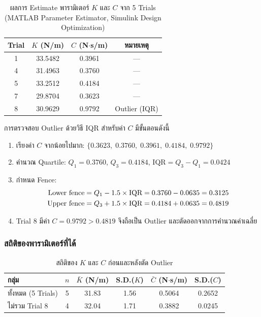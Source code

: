 \begin{table}[htbp]
    \centering
    \caption{ผลการ Estimate พารามิเตอร์ $K$ และ $C$ จาก 5 Trials
             (MATLAB Parameter Estimator, Simulink Design Optimization)}
    \label{tab:param_est_raw}
    \begin{tabular}{cccc}
        \hline
        \textbf{Trial} & \textbf{$K$ (N/m)} & \textbf{$C$ (N$\cdot$s/m)} & \textbf{หมายเหตุ} \\
        \hline
        1 & 33.5482 & 0.3961 & --- \\
        4 & 31.4963 & 0.3760 & --- \\
        5 & 33.2512 & 0.4184 & --- \\
        7 & 29.8704 & 0.3623 & --- \\
        8 & 30.9629 & 0.9792 & Outlier (IQR) \\
        \hline
    \end{tabular}
\end{table}
 
การตรวจสอบ Outlier ด้วยวิธี IQR สำหรับค่า $C$
มีขั้นตอนดังนี้
 
\begin{enumerate}
    \item เรียงค่า $C$ จากน้อยไปมาก:
          $\{0.3623,\; 0.3760,\; 0.3961,\; 0.4184,\; 0.9792\}$
    \item คำนวณ Quartile:
          $Q_1 = 0.3760$, $Q_3 = 0.4184$,
          $\text{IQR} = Q_3 - Q_1 = 0.0424$
    \item กำหนด Fence:
          \begin{align}
              \text{Lower fence} &= Q_1 - 1.5 \times \text{IQR}
                                  = 0.3760 - 0.0635 = 0.3125 \notag \\
              \text{Upper fence} &= Q_3 + 1.5 \times \text{IQR}
                                  = 0.4184 + 0.0635 = 0.4819 \notag
          \end{align}
    \item Trial 8 มีค่า $C = 0.9792 > 0.4819$ จึงถือเป็น Outlier
          และตัดออกจากการคำนวณค่าเฉลี่ย
\end{enumerate}
 
\subsubsection{สถิติของพารามิเตอร์ที่ได้}
 
\begin{table}[htbp]
    \centering
    \caption{สถิติของ $K$ และ $C$ ก่อนและหลังตัด Outlier}
    \label{tab:param_stats}
    \begin{tabular}{lccccc}
        \hline
        \textbf{กลุ่ม} & \textbf{$n$}
            & \textbf{$\bar{K}$ (N/m)} & \textbf{S.D.($K$)}
            & \textbf{$\bar{C}$ (N$\cdot$s/m)} & \textbf{S.D.($C$)} \\
        \hline
        ทั้งหมด (5 Trials) & 5 & 31.83 & 1.56 & 0.5064 & 0.2652 \\
        ไม่รวม Trial 8     & 4 & 32.04 & 1.71 & 0.3882 & 0.0245 \\
        \hline
    \end{tabular}
\end{table}
 
